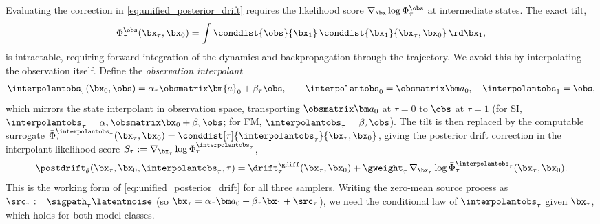 Evaluating the correction in \eqref{eq:unified_posterior_drift} requires the likelihood score $\nabla_{\bx}\log\Phi_\tau^{\obs}$ at intermediate states. The exact tilt,
\begin{align}\label{eq:phi_integral}
    \Phi_{\tau}^{\obs}(\bx_\tau, \bx_0)
    = \int \conddist{\obs}{\bx_1}\, \conddist{\bx_1}{\bx_\tau, \bx_0}\, \rd \bx_1,
\end{align}
is intractable, requiring forward integration of the dynamics and backpropagation through the trajectory. We avoid this by interpolating the observation itself. Define the \emph{observation interpolant}
\begin{align} \label{eq:interpolated_observation}
    \interpolantobs_\tau(\bx_0, \obs) = \alpha_\tau \obsmatrix\bm{a}_0 + \beta_\tau \obs,
    \qquad \interpolantobs_0 = \obsmatrix\bm a_0,\quad \interpolantobs_1 = \obs,
\end{align}
which mirrors the state interpolant in observation space, transporting $\obsmatrix\bm a_0$ at $\tau=0$ to $\obs$ at $\tau=1$ (for SI, $\interpolantobs_\tau = \alpha_\tau\obsmatrix\bx_0 + \beta_\tau\obs$; for FM, $\interpolantobs_\tau = \beta_\tau\obs$). The tilt is then replaced by the computable surrogate $\bar{\Phi}_{\tau}^{\interpolantobs_\tau}(\bx_\tau, \bx_0) = \conddist[\tau]{\interpolantobs_\tau}{\bx_\tau, \bx_0}$, giving the posterior drift correction in the interpolant-likelihood score $\bar S_\tau := \nabla_{\bx_\tau}\log\bar\Phi_\tau^{\interpolantobs_\tau}$,
\begin{align} \label{eq:interpolant_posterior_drift}
    \postdrift_\theta(\bx_{\tau}, \bx_0, \interpolantobs_\tau, \tau)
    =
    \drift^{\gdiff}_\tau(\bx_{\tau}, \bx_0)
    + \gweight_\tau\,
    \nabla_{\bx_\tau} \log\bar{\Phi}_{\tau}^{\interpolantobs_\tau}(\bx_\tau, \bx_0).
\end{align}
This is the working form of \eqref{eq:unified_posterior_drift} for all three samplers. Writing the zero-mean source process as $\src_\tau := \sigpath_\tau\latentnoise$ (so $\bx_\tau = \alpha_\tau\bm a_0 + \beta_\tau\bx_1 + \src_\tau$), we need the conditional law of $\interpolantobs_\tau$ given $\bx_\tau$, which holds for both model classes.

